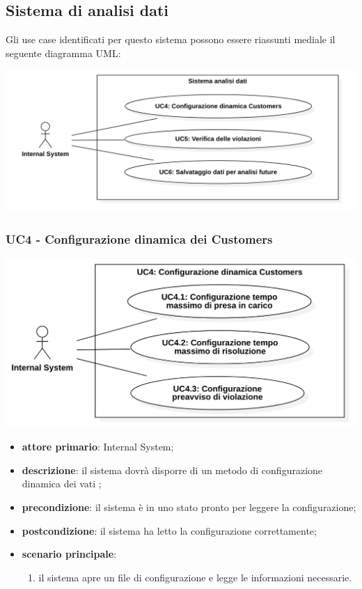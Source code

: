 \subsection{Sistema di analisi dati}
Gli use case identificati per questo sistema possono essere riassunti mediale il seguente diagramma UML:
\begin{center}
	\includegraphics[keepaspectratio = true, width=15cm]{immagini/uc/3.png}
\end{center}
\subsubsection{UC4 - Configurazione dinamica dei Customers}
\begin{center}
	\includegraphics[keepaspectratio = true, width=15cm]{immagini/uc/4.png}
\end{center}
\begin{itemize}
	\item \textbf{attore primario}: Internal System;
	\item \textbf{descrizione}: il sistema dovrà disporre di un metodo di configurazione dinamica dei vati  ;
	\item \textbf{precondizione}: il sistema è in uno stato pronto per leggere la configurazione;
	\item \textbf{postcondizione}: il sistema ha letto la configurazione correttamente;
	\item \textbf{scenario principale}: 
	\begin{enumerate}
		\item il sistema apre un file di configurazione e legge le informazioni necessarie.
	\end{enumerate}
\end{itemize}
